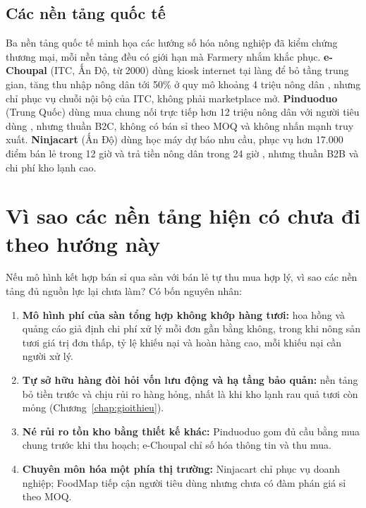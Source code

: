 \subsection{Các nền tảng quốc tế}
\label{subsec:sosanhquocte}

Ba nền tảng quốc tế minh họa các hướng số hóa nông nghiệp đã kiểm chứng thương mại, mỗi nền tảng đều có giới hạn mà Farmery nhắm khắc phục. \textbf{e-Choupal} (ITC, Ấn Độ, từ 2000) dùng kiosk internet tại làng để bỏ tầng trung gian, tăng thu nhập nông dân tới 50\% ở quy mô khoảng 4 triệu nông dân \parencite{business_standard_2020_echoupal}, nhưng chỉ phục vụ chuỗi nội bộ của ITC, không phải marketplace mở. \textbf{Pinduoduo} (Trung Quốc) dùng mua chung nối trực tiếp hơn 12 triệu nông dân với người tiêu dùng \parencite{nasdaq_2021_pinduoduo}, nhưng thuần B2C, không có bán sỉ theo MOQ và không nhấn mạnh truy xuất. \textbf{Ninjacart} (Ấn Độ) dùng học máy dự báo nhu cầu, phục vụ hơn 17.000 điểm bán lẻ trong 12 giờ và trả tiền nông dân trong 24 giờ \parencite{ninjacart}, nhưng thuần B2B và chi phí kho lạnh cao.

\section{Vì sao các nền tảng hiện có chưa đi theo hướng này}
\label{sec:visaochualam}

Nếu mô hình kết hợp bán sỉ qua sàn với bán lẻ tự thu mua hợp lý, vì sao các nền tảng đủ nguồn lực lại chưa làm? Có bốn nguyên nhân:

\begin{enumerate}
    \item[\textbf{N1.}] \textbf{Mô hình phí của sàn tổng hợp không khớp hàng tươi:} hoa hồng và quảng cáo giả định chi phí xử lý mỗi đơn gần bằng không, trong khi nông sản tươi giá trị đơn thấp, tỷ lệ khiếu nại và hoàn hàng cao, mỗi khiếu nại cần người xử lý.
    \item[\textbf{N2.}] \textbf{Tự sở hữu hàng đòi hỏi vốn lưu động và hạ tầng bảo quản:} nền tảng bỏ tiền trước và chịu rủi ro hàng hỏng, nhất là khi kho lạnh rau quả tươi còn mỏng (Chương~\ref{chap:gioithieu}).
    \item[\textbf{N3.}] \textbf{Né rủi ro tồn kho bằng thiết kế khác:} Pinduoduo gom đủ cầu bằng mua chung trước khi thu hoạch; e-Choupal chỉ số hóa thông tin và thu mua.
    \item[\textbf{N4.}] \textbf{Chuyên môn hóa một phía thị trường:} Ninjacart chỉ phục vụ doanh nghiệp; FoodMap tiếp cận người tiêu dùng nhưng chưa có đàm phán giá sỉ theo MOQ.
\end{enumerate}

